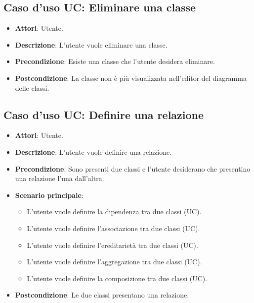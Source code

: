 \documentclass[../AnalisiDeiRequisiti.tex]{subfiles}
\begin{document}
		\subsection{Caso d'uso UC: Eliminare una classe}
		\begin{itemize}
			\item\textbf{Attori}: Utente.
			\item\textbf{Descrizione}: L'utente vuole eliminare una classe.
			\item\textbf{Precondizione}: Esiste una classe che l'utente desidera eliminare.
			\item\textbf{Postcondizione}: La classe non è più visualizzata nell'editor del diagramma delle classi.
		\end{itemize}
		
		\subsection{Caso d'uso UC: Definire una relazione}
		\begin{itemize}
			\item\textbf{Attori}: Utente.
			\item\textbf{Descrizione}: L'utente vuole definire una relazione.
			\item\textbf{Precondizione}: Sono presenti due classi e l'utente desiderano che presentino una relazione l'una dall'altra.
			\item\textbf{Scenario principale}: 
			\begin{itemize}
				\item L'utente vuole definire la dipendenza tra due classi (UC).
				\item L'utente vuole definire l'associazione tra due classi (UC).
				\item L'utente vuole definire l'ereditarietà tra due classi (UC).
				\item L'utente vuole definire l'aggregazione tra due classi (UC).
				\item L'utente vuole definire la composizione tra due classi (UC).
			\end{itemize}
			\item\textbf{Postcondizione}: Le due classi presentano una relazione.
			
		\end{itemize}
		
\end{document}
